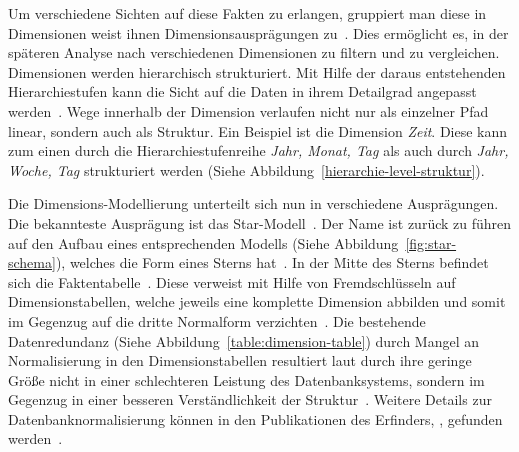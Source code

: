 \documentclass[
  language=german, %
  type=bachelor%
]{isthesis}
\begin{document}
\begin{content}
  Um verschiedene Sichten auf diese Fakten zu erlangen, gruppiert man diese in
  Dimensionen \bzw{} weist ihnen Dimensionsausprägungen zu~\cite[][S.
  66]{Kemper2010}. Dies ermöglicht es, in der späteren Analyse nach
  verschiedenen Dimensionen zu filtern und zu vergleichen. Dimensionen werden
  hierarchisch strukturiert. Mit Hilfe der daraus entstehenden Hierarchiestufen
  kann die Sicht auf die Daten in ihrem Detailgrad angepasst werden~\cite[][S.
  66]{Kemper2010}. Wege innerhalb der Dimension verlaufen nicht nur als
  einzelner Pfad linear, sondern auch als Struktur. Ein Beispiel ist die
  Dimension \textit{Zeit}.  Diese kann zum einen durch die
  Hierarchiestufenreihe \textit{Jahr, Monat, Tag} als auch durch \textit{Jahr,
  Woche, Tag} strukturiert werden (Siehe
  Abbildung~\ref{hierarchie-level-struktur}).

  \begin{figure}[caption={Dimensionslevelstrukturbeispiel---Zeit}, label={hierarchie-level-struktur}]
    \resizebox{100pt}{!}{}
  \end{figure}

  Die Dimensions-Modellierung unterteilt sich nun in verschiedene Ausprägungen.
  Die bekannteste Ausprägung ist das Star-Modell~\cite[][S.
  2]{phipps2002automating}. Der Name ist zurück zu f\"uhren auf den Aufbau
  eines entsprechenden Modells (Siehe Abbildung~\ref{fig:star-schema}), welches
  die Form eines Sterns hat~\cite[][S.  44]{Kimball2013}. In der Mitte des
  Sterns befindet sich die Faktentabelle~\cite[][S. 67]{Kemper2010}. Diese
  verweist mit Hilfe von Fremdschlüsseln auf Dimensionstabellen, welche jeweils
  eine komplette Dimension abbilden und somit im Gegenzug auf die dritte
  Normalform verzichten~\cite[][S. 67 f.]{Kemper2010}. Die bestehende
  Datenredundanz (Siehe Abbildung~\ref{table:dimension-table}) durch Mangel an
  Normalisierung in den Dimensionstabellen resultiert laut
  \textsc{\citeauthor{Kimball2013}} durch ihre geringe Größe nicht in einer
  schlechteren Leistung des Datenbanksystems, sondern im Gegenzug in einer
  besseren Verständlichkeit der Struktur~\cite[][S. 15]{Kimball2013}. Weitere
  Details zur Datenbanknormalisierung können in den Publikationen des
  Erfinders, \textsc{\citeauthor{codd1970relational}}, gefunden
  werden~\cite[][]{codd1970relational,codd1972further}.

  \begin{figure}[caption={Star-Schema Beispielmodell angelehnt an~\cite{Kemper2010} Abb. 2.30}, label={fig:star-schema}]
    \resizebox{0.5\linewidth}{!}{}
  \end{figure}


\end{content}
\end{document}
